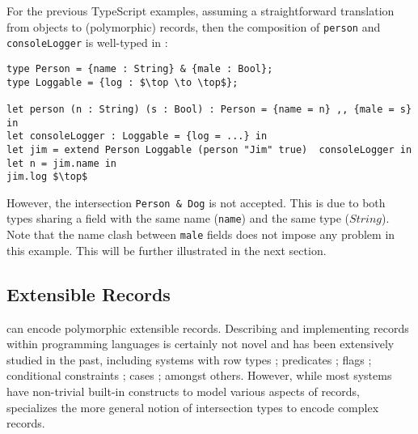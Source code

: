 For the previous TypeScript examples, assuming a straightforward
translation from objects to (polymorphic) records, then the
composition of \lstinline{person} and \lstinline{consoleLogger} is
well-typed in \name:

\begin{lstlisting}[mathescape=true]
type Person = {name : String} & {male : Bool};
type Loggable = {log : $\top \to \top$};

let person (n : String) (s : Bool) : Person = {name = n} ,, {male = s} in
let consoleLogger : Loggable = {log = ...} in
let jim = extend Person Loggable (person "Jim" true)  consoleLogger in
let n = jim.name in
jim.log $\top$
\end{lstlisting}

However, the intersection \lstinline$Person & Dog$ is not accepted.
This is due to both types sharing a field with the same name (\lstinline$name$) 
and the same type ($String$). 
Note that the name clash between \lstinline$male$ fields does not impose any 
problem in this example.
This will be further illustrated in the next section.

\subsection{Extensible Records}
\name can encode polymorphic extensible records. Describing and
implementing records within programming languages is certainly not
novel and has been extensively studied in the past, including
systems with row types \cite{wand1987complete,wand1989type}; 
predicates \cite{harper1990extensible,harper1991record,gaster1996polymorphic}; 
flags \cite{remy1993type}; conditional constraints \cite{pottier2003constraint};
cases \cite{blume2006extensible}; amongst others. However, while 
most systems have non-trivial built-in constructs to model various aspects of
records, \name specializes the more general notion of intersection
types to encode complex records.

